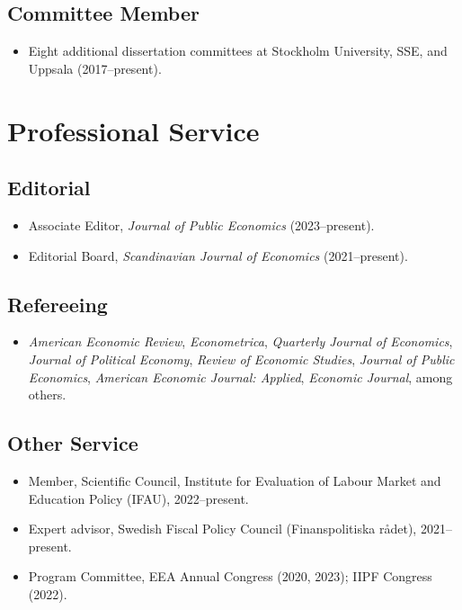 \documentclass[11pt]{article}
\begin{document}
\subsection{Committee Member}
\begin{itemize}
\item Eight additional dissertation committees at Stockholm University, SSE, and Uppsala (2017--present).
\end{itemize}

\section{Professional Service}
\subsection{Editorial}
\begin{itemize}
\item Associate Editor, \emph{Journal of Public Economics} (2023--present).
\item Editorial Board, \emph{Scandinavian Journal of Economics} (2021--present).
\end{itemize}
\subsection{Refereeing}
\begin{itemize}
\item \emph{American Economic Review}, \emph{Econometrica}, \emph{Quarterly Journal of Economics},
\emph{Journal of Political Economy}, \emph{Review of Economic Studies}, \emph{Journal of Public Economics},
\emph{American Economic Journal: Applied}, \emph{Economic Journal}, among others.
\end{itemize}
\subsection{Other Service}
\begin{itemize}
\item Member, Scientific Council, Institute for Evaluation of Labour Market and Education Policy (IFAU), 2022--present.
\item Expert advisor, Swedish Fiscal Policy Council (Finanspolitiska r\aa det), 2021--present.
\item Program Committee, EEA Annual Congress (2020, 2023); IIPF Congress (2022).
\end{itemize}
\end{document}
